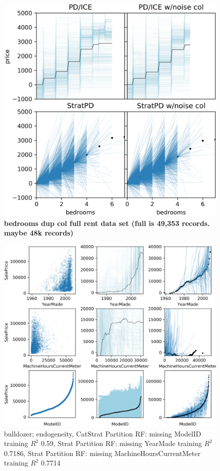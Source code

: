 \documentclass[12pt]{article}
\begin{document}
\begin{figure}[htbp]
\begin{center}
\includegraphics[scale=0.6]{images/bedrooms_vs_price_noise.png}
\caption{{\bf  bedrooms dup col full rent data set (full is 49,353 records. maybe 48k records)}}
\label{fig:beds_noise}
\end{center}
\end{figure}

\begin{figure}[htbp]
\begin{center}
\includegraphics[scale=0.7]{images/bulldozer.png}
\caption{bulldozer; endogeneity, CatStrat Partition RF: missing ModelID training $R^2$ 0.59, Strat Partition RF: missing YearMade training $R^2$ 0.7186, Strat Partition RF: missing MachineHoursCurrentMeter training $R^2$ 0.7714}
\label{fig:bulldozer}
\end{center}
\end{figure}
\end{document}
